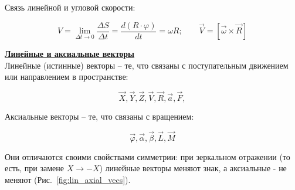 Связь линейной и угловой скорости:

      \begin{displaymath}
      V=\lim_{\Delta t\rightarrow0}\frac{\Delta S}{\Delta t}=\frac{d(R\cdot\varphi)}{dt}=
      \omega R;\;\;\;\;\;\;\;\vec{V}=\left[\vec{\omega}\times\vec{R}\right]
      \end{displaymath}

\underline{\bf Линейные и аксиальные векторы}\\

Линейные (истинные) векторы -- те, что связаны с поступательным движением или направлением в пространстве:

 \begin{displaymath}
 \vec{X}, \vec{Y}, \vec{Z}, \vec{V}, \vec{R}, \vec{a}, \vec{F},
 \end{displaymath}

Аксиальные векторы -- те, что связаны с вращением:

 \begin{displaymath}
 \vec{\varphi}, \vec{\alpha}, \vec{\beta}, \vec{L}, \vec{M}
 \end{displaymath}

Они отличаются своими свойствами симметрии: при зеркальном отра\-жении (то есть, при замене $X \rightarrow -X$) линейные векторы меняют знак, а аксиальные - не меняют (Рис.~\ref{fig:lin_axial_vecs}).

